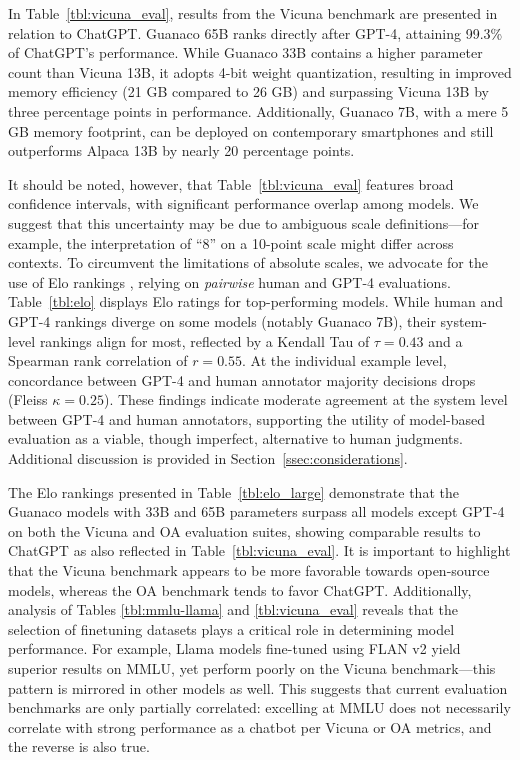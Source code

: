 In Table~\ref{tbl:vicuna_eval}, results from the Vicuna benchmark \cite{vicuna2023} are presented in relation to ChatGPT. {Guanaco} 65B ranks directly after GPT-4, attaining 99.3\% of ChatGPT’s performance. While {Guanaco} 33B contains a higher parameter count than Vicuna 13B, it adopts 4-bit weight quantization, resulting in improved memory efficiency (21 GB compared to 26 GB) and surpassing Vicuna 13B by three percentage points in performance. Additionally, {Guanaco} 7B, with a mere 5 GB memory footprint, can be deployed on contemporary smartphones and still outperforms Alpaca 13B by nearly 20 percentage points.

It should be noted, however, that Table~\ref{tbl:vicuna_eval} features broad confidence intervals, with significant performance overlap among models. We suggest that this uncertainty may be due to ambiguous scale definitions—for example, the interpretation of “8” on a 10-point scale might differ across contexts. To circumvent the limitations of absolute scales, we advocate for the use of Elo rankings \citep{elo1967proposed}, relying on \textit{pairwise} human and GPT-4 evaluations. Table~\ref{tbl:elo} displays Elo ratings for top-performing models. While human and GPT-4 rankings diverge on some models (notably Guanaco 7B), their system-level rankings align for most, reflected by a Kendall Tau of $\tau=0.43$ and a Spearman rank correlation of $r=0.55$. At the individual example level, concordance between GPT-4 and human annotator majority decisions drops (Fleiss $\kappa=0.25$). These findings indicate moderate agreement at the system level between GPT-4 and human annotators, supporting the utility of model-based evaluation as a viable, though imperfect, alternative to human judgments. Additional discussion is provided in Section~\ref{ssec:considerations}.

The Elo rankings presented in Table~\ref{tbl:elo_large} demonstrate that the {Guanaco} models with 33B and 65B parameters surpass all models except GPT-4 on both the Vicuna and OA evaluation suites, showing comparable results to ChatGPT as also reflected in Table~\ref{tbl:vicuna_eval}. It is important to highlight that the Vicuna benchmark appears to be more favorable towards open-source models, whereas the OA benchmark tends to favor ChatGPT. Additionally, analysis of Tables \ref{tbl:mmlu-llama} and \ref{tbl:vicuna_eval} reveals that the selection of finetuning datasets plays a critical role in determining model performance. For example, Llama models fine-tuned using FLAN v2 yield superior results on MMLU, yet perform poorly on the Vicuna benchmark—this pattern is mirrored in other models as well. This suggests that current evaluation benchmarks are only partially correlated: excelling at MMLU does not necessarily correlate with strong performance as a chatbot per Vicuna or OA metrics, and the reverse is also true.

